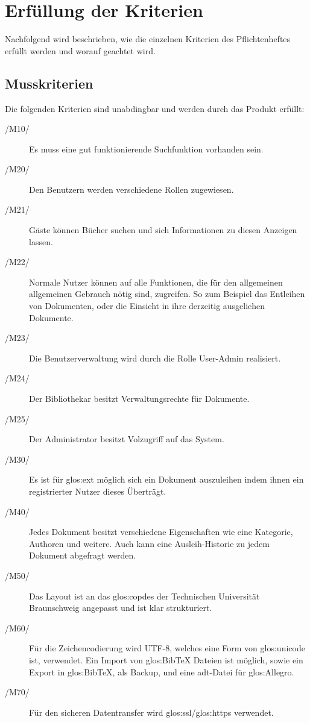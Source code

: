 \chapter{Erfüllung der Kriterien}

Nachfolgend wird beschrieben, wie die einzelnen Kriterien des Pflichtenheftes
erfüllt werden und worauf geachtet wird.
\section{Musskriterien}

Die folgenden Kriterien sind unabdingbar und werden durch das Produkt erfüllt:
\begin{description}
  \item[/M10/] Es muss eine gut funktionierende Suchfunktion vorhanden sein.
  \item[/M20/] Den Benutzern werden verschiedene Rollen zugewiesen.
  \item[/M21/] Gäste können Bücher suchen und sich Informationen zu diesen
	Anzeigen lassen.
  \item[/M22/] Normale Nutzer können auf alle Funktionen, die für den
	allgemeinen allgemeinen Gebrauch nötig sind, zugreifen. So zum Beispiel
	das Entleihen von Dokumenten, oder die Einsicht in ihre derzeitig
	ausgeliehen Dokumente.
  \item[/M23/] Die Benutzerverwaltung wird durch die Rolle User-Admin realisiert.
  \item[/M24/] Der Bibliothekar besitzt Verwaltungsrechte für Dokumente.
  \item[/M25/] Der Administrator besitzt Volzugriff auf das System.
  \item[/M30/] Es ist für \gls{glos:ext} möglich sich ein Dokument auszuleihen
	indem ihnen ein registrierter Nutzer dieses Überträgt.
  \item[/M40/] Jedes Dokument besitzt verschiedene Eigenschaften wie eine
	Kategorie, Authoren und weitere. Auch kann eine Ausleih-Historie zu jedem
	Dokument abgefragt werden.
  \item[/M50/] Das Layout ist an das \gls{glos:copdes} der Technischen
	Universität Braunschweig angepasst und ist klar strukturiert.
  \item[/M60/] Für die Zeichencodierung wird UTF-8, welches eine Form von
	\gls{glos:unicode} ist, verwendet.
	Ein Import von \gls{glos:BibTeX} Dateien ist möglich, sowie ein Export in
	\gls{glos:BibTeX}, als Backup, und eine adt-Datei für \gls{glos:Allegro}.
  \item[/M70/] Für den sicheren Datentransfer wird \gls{glos:ssl}/\gls{glos:https} verwendet.
\end{description}

